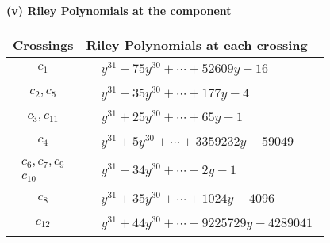 \documentclass[1p]{elsarticle_modified}
\theoremstyle{definition}
\begin{document}
\newpage\renewcommand{\arraystretch}{1}
\flushleft \textbf{(v) Riley Polynomials at the component}\newline \\
\begin{tabular}{m{50pt}|m{274pt}}
Crossings & \hspace{64pt}Riley Polynomials at each crossing \\
\hline $$\begin{aligned}c_{1}\end{aligned}$$&$\begin{aligned}
&y^{31}-75 y^{30}+\cdots+52609 y-16
\end{aligned}$\\
\hline $$\begin{aligned}c_{2},c_{5}\end{aligned}$$&$\begin{aligned}
&y^{31}-35 y^{30}+\cdots+177 y-4
\end{aligned}$\\
\hline $$\begin{aligned}c_{3},c_{11}\end{aligned}$$&$\begin{aligned}
&y^{31}+25 y^{30}+\cdots+65 y-1
\end{aligned}$\\
\hline $$\begin{aligned}c_{4}\end{aligned}$$&$\begin{aligned}
&y^{31}+5 y^{30}+\cdots+3359232 y-59049
\end{aligned}$\\
\hline $$\begin{aligned}c_{6},c_{7},c_{9}\\c_{10}\end{aligned}$$&$\begin{aligned}
&y^{31}-34 y^{30}+\cdots-2 y-1
\end{aligned}$\\
\hline $$\begin{aligned}c_{8}\end{aligned}$$&$\begin{aligned}
&y^{31}+35 y^{30}+\cdots+1024 y-4096
\end{aligned}$\\
\hline $$\begin{aligned}c_{12}\end{aligned}$$&$\begin{aligned}
&y^{31}+44 y^{30}+\cdots-9225729 y-4289041
\end{aligned}$\\
\hline
\end{tabular}\\~\\
\end{document}
